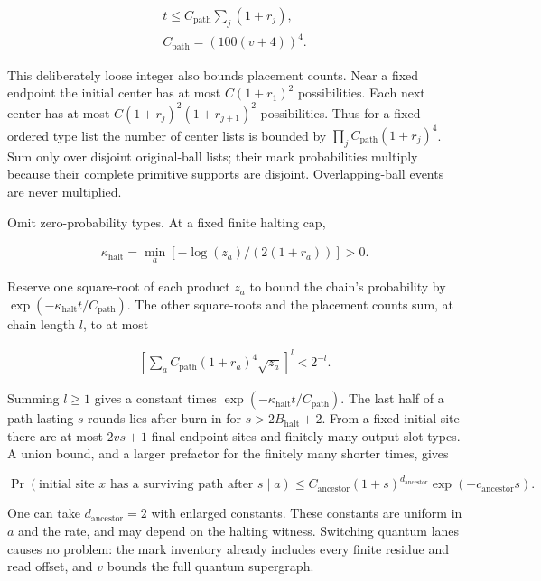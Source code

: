 \[
\begin{gathered}
t\le C_{\mathrm{path}} \sum _{j} (1+r_{j}), \\ C_{\mathrm{path}}=(100(v+4))^{4}.
\end{gathered}
\]

This deliberately loose integer also bounds placement counts. Near a fixed endpoint the initial center has at most \(C(1+r_{1})^{2}\) possibilities. Each next center has at most \(C(1+r_{j})^{2}(1+r_{j+1})^{2}\) possibilities. Thus for a fixed ordered type list the number of center lists is bounded by \(\prod_{j} C_{\mathrm{path}}(1+r_{j})^{4}\). Sum only over disjoint original-ball lists; their mark probabilities multiply because their complete primitive supports are disjoint. Overlapping-ball events are never multiplied.

Omit zero-probability types. At a fixed finite halting cap,

\[
\begin{gathered}
\kappa_{\mathrm{halt}}=\min _{a} [-\log (z_{a})/(2(1+r_{a}))]>0.
\end{gathered}
\]

Reserve one square-root of each product \(z_{a}\) to bound the chain's probability by \(\exp (-\kappa_{\mathrm{halt}} t/C_{\mathrm{path}})\). The other square-roots and the placement counts sum, at chain length \(l\), to at most

\[
\begin{gathered}
[\sum _{a} C_{\mathrm{path}}(1+r_{a})^{4} \sqrt{z_{a}}]^{l} < 2^{-l}.
\end{gathered}
\]

Summing \(l\ge 1\) gives a constant times \(\exp (-\kappa_{\mathrm{halt}} t/C_{\mathrm{path}})\). The last half of a path lasting \(s\) rounds lies after burn-in for \(s>2B_{\mathrm{halt}}+2\). From a fixed initial site there are at most \(2vs+1\) final endpoint sites and finitely many output-slot types. A union bound, and a larger prefactor for the finitely many shorter times, gives

\[
\Pr(\text{initial site }x\text{ has a surviving path after }s\mid a) \le C_{\mathrm{ancestor}}(1+s)^{d_{\mathrm{ancestor}}}\exp (-c_{\mathrm{ancestor}} s).
\]

One can take \(d_{\mathrm{ancestor}}=2\) with enlarged constants. These constants are uniform in \(a\) and the rate, and may depend on the halting witness. Switching quantum lanes causes no problem: the mark inventory already includes every finite residue and read offset, and \(v\) bounds the full quantum supergraph.

